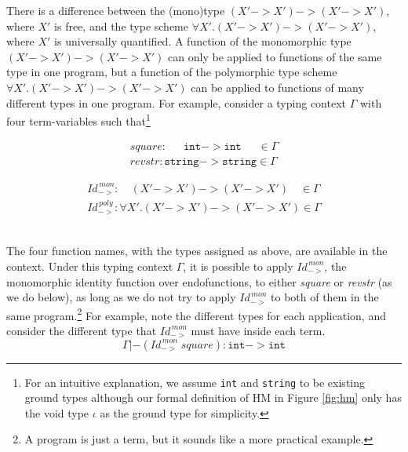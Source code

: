 There is a difference between the (mono)type $(X'-> X')-> (X'-> X')$,
where $X'$ is free, and the type scheme $\forall X'.(X'-> X')-> (X'-> X')$,
where $X'$ is universally quantified.
A function of the monomorphic type $(X'-> X')-> (X'-> X')$
can only be applied to functions of the same type in one program, but
a function of the polymorphic type scheme $\forall X'.(X'-> X')-> (X'-> X')$
can be applied to functions of many different types in one program.
For example, consider a typing context $\Gamma$ with four term-variables such that\footnote{
        For an intuitive explanation, we assume \texttt{int} and \texttt{string}
        to be existing ground types although our formal definition of HM
        in Figure \ref{fig:hm} only has the void type $\iota$ as
        the ground type for simplicity.} \vspace*{-1em}\\ 
\begin{minipage}{.3\linewidth}
\begin{align*}
\!\!\!\!\!\!\!\!\!\!
\textit{square} : \;\quad~\texttt{int} -> \texttt{int} ~\quad\; \in \Gamma \\
\!\!\!\!\!\!\!\!\!\!
\textit{revstr} : \texttt{string} -> \texttt{string} \in \Gamma
\end{align*}
\end{minipage}
\begin{minipage}{.4\linewidth}
\begin{align*}
\textit{Id}_{->}^{\,\textit{mon}} : \quad (X'-> X')-> (X'-> X') \quad \in \Gamma \\
\textit{Id}_{->}^{\,\textit{poly}} : \forall X'.(X'-> X')-> (X'-> X') \in \Gamma
\end{align*}
\end{minipage} \vspace*{1em} \\
The four function names, with the types assigned as above,
are available in the context. Under this typing context $\Gamma$,
it is possible to apply $\textit{Id}_{->}^{\,\textit{mon}}$,
the monomorphic identity function over endofunctions,
to either \textit{square} or \textit{revstr} (as we do below),
as long as we do not try to apply $\textit{Id}_{->}^{\,\textit{mon}}$ to both
of them in the same program.\footnote{A program is just a term, but it sounds
like a more practical example.} For example, note the different types
for each application, and consider the different type that $\textit{Id}_{->}^{\,\textit{mon}}$
must have inside each term.
\[ \Gamma |-
        (\textit{Id}_{->}^{\,\textit{mon}}\;\textit{square}) :
        \texttt{int} -> \texttt{int}
\]
